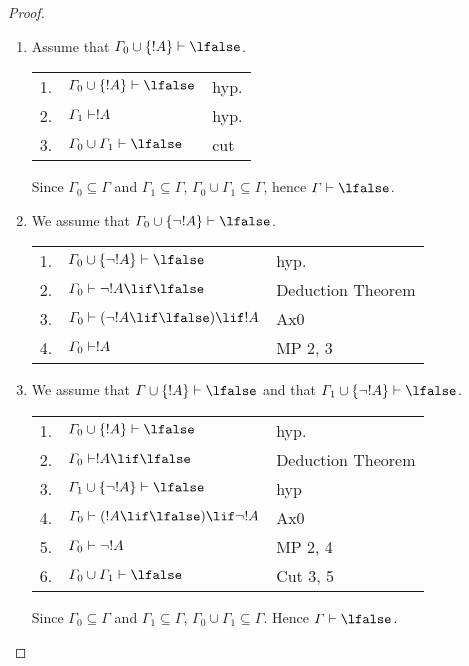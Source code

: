\documentclass[../../include/open-logic-section]{subfiles}
\begin{document}
\begin{proof} 
\begin{enumerate}
\item Assume that $\Gamma_0 \cup \{!A\} \Proves \lfalse$.

\begin{tabular}{rll} 
1. & $\Gamma_0 \cup \{!A\} \Proves \lfalse$ & hyp. \\
2. & $\Gamma_1 \Proves !A$ & hyp.\\ 
3. & $\Gamma_0 \cup \Gamma_1 \Proves \lfalse$ & cut \\ 
\end{tabular}

Since $\Gamma_0 \subseteq \Gamma$ and $\Gamma_1 \subseteq \Gamma$,
$\Gamma_0 \cup \Gamma_1 \subseteq \Gamma$, hence $\Gamma \Proves \lfalse$.

\item We assume that $\Gamma_0 \cup\{\lnot !A\} \Proves \lfalse$.

\begin{tabular}{rll} 
1. & $\Gamma_0 \cup\{\lnot !A\} \Proves \lfalse$ & hyp. \\ 
2. & $\Gamma_0 \Proves \lnot !A \lif \lfalse$ & Deduction Theorem\\
3. & $\Gamma_0 \Proves (\lnot !A \lif \lfalse) \lif !A$ & Ax0\\ 
4. & $\Gamma_0 \Proves !A$ & MP 2, 3 \\ 
\end{tabular}

\item We assume that $\Gamma \cup \{ !A \} \Proves \lfalse$ and that
$\Gamma_1 \cup \{\lnot !A \} \Proves \lfalse$.

\begin{tabular}{rll} 
1. & $\Gamma_0 \cup\{!A\} \Proves \lfalse$ & hyp. \\
2. & $\Gamma_0 \Proves !A \lif \lfalse$ & Deduction Theorem \\ 
3. & $\Gamma_1 \cup \{\lnot !A \} \Proves \lfalse$ & hyp\\ 
4. & $\Gamma_0 \Proves (!A \lif \lfalse) \lif \lnot !A$ & Ax0\\ 
5. & $\Gamma_0 \Proves \lnot !A$ & MP 2, 4\\ 
6. & $\Gamma_0 \cup \Gamma_1 \Proves \lfalse$ & Cut 3, 5 \\
\end{tabular}

Since $\Gamma_0 \subseteq \Gamma$ and $\Gamma_1 \subseteq \Gamma$,
$\Gamma_0 \cup \Gamma_1 \subseteq \Gamma$. Hence $\Gamma \Proves \lfalse$.


\end{enumerate}
\end{proof}
\end{document}
